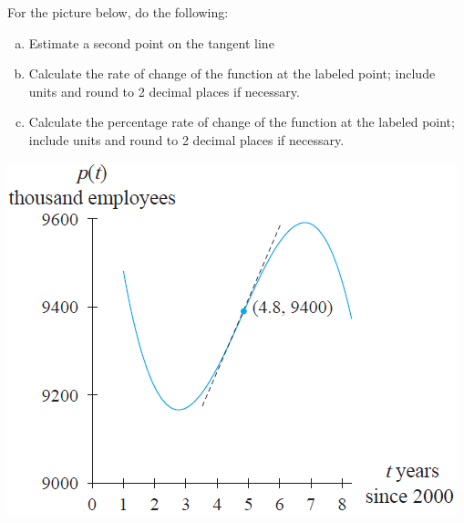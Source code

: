 \documentclass[notes]{subfiles}
\begin{document}
		\begin{ex}
			For the picture below, do the following:
			\begin{enumerate}[(a)]
				\item Estimate a second point on the tangent line
				\item Calculate the rate of change of the function at the labeled point; include units and round to 2 decimal places if necessary.
				\item Calculate the percentage rate of change of the function at the labeled point; include units and round to 2 decimal places if necessary.
			\end{enumerate}
		\end{ex}
			\begin{center}
				\includegraphics[scale = 1.5]{img/sec22-3.png}
			\end{center}
	\clearpage
\end{document}
